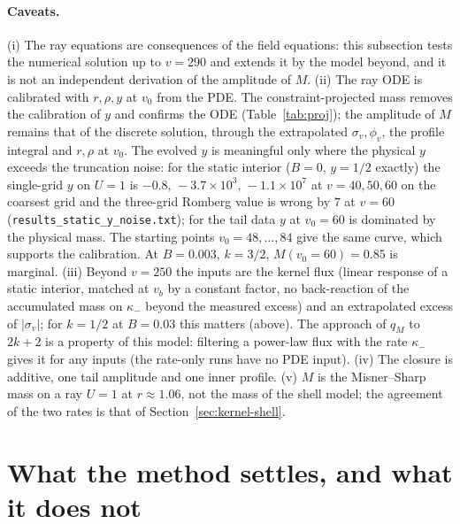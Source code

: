 \documentclass[11pt]{article}
\begin{document}
\paragraph{Caveats.} (i) The ray equations are consequences of the field equations: this subsection tests the numerical solution up to $v=290$ and extends it by the model beyond, and it is not an independent derivation of the amplitude of $M$. (ii) The ray ODE is calibrated with $r,\rho,y$ at $v_0$ from the PDE. The constraint-projected mass removes the calibration of $y$ and confirms the ODE (Table~\ref{tab:proj}); the amplitude of $M$ remains that of the discrete solution, through the extrapolated $\sigma_v,\phi_v$, the profile integral and $r,\rho$ at $v_0$. The evolved $y$ is meaningful only where the physical $y$ exceeds the truncation noise: for the static interior ($B=0$, $y=1/2$ exactly) the single-grid $y$ on $U=1$ is $-0.8,\,-3.7\times10^{3},\,-1.1\times10^{7}$ at $v=40,50,60$ on the coarsest grid and the three-grid Romberg value is wrong by $7$ at $v=60$ (\texttt{results\_static\_y\_noise.txt}); for the tail data $y$ at $v_0=60$ is dominated by the physical mass. The starting points $v_0=48,\dots,84$ give the same curve, which supports the calibration. At $B=0.003$, $k=3/2$, $M(v_0=60)=0.85$ is marginal. (iii) Beyond $v=250$ the inputs are the kernel flux (linear response of a static interior, matched at $v_b$ by a constant factor, no back-reaction of the accumulated mass on $\kappa_-$ beyond the measured excess) and an extrapolated excess of $|\sigma_v|$; for $k=1/2$ at $B=0.03$ this matters (above). The approach of $q_M$ to $2k+2$ is a property of this model: filtering a power-law flux with the rate $\kappa_-$ gives it for any inputs (the rate-only runs have no PDE input). (iv) The closure is additive, one tail amplitude and one inner profile. (v) $M$ is the Misner--Sharp mass on a ray $U=1$ at $r\approx1.06$, not the mass of the shell model; the agreement of the two rates is that of Section~\ref{sec:kernel-shell}.


\section{What the method settles, and what it does not}
\label{sec:limits}
\end{document}
